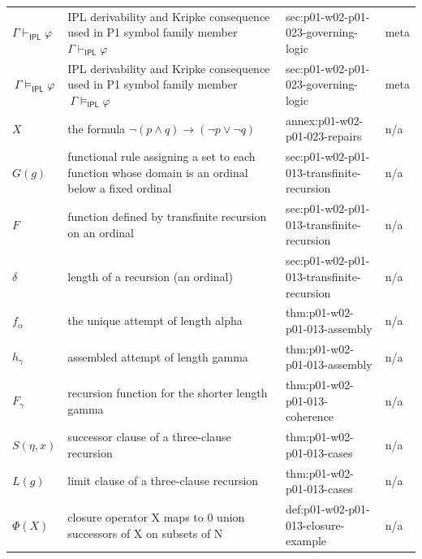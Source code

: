 \begin{longtable}{@{}p{}p{}p{}p{}@{}}
\(\Gamma\vdash_{\mathsf{IPL}}\varphi\) & IPL derivability and Kripke consequence used in P1 symbol family member \(\Gamma\vdash_{\mathsf{IPL}}\varphi\) & sec:\allowbreak{}p01-\allowbreak{}w02-\allowbreak{}p01-\allowbreak{}023-\allowbreak{}governing-\allowbreak{}logic & meta \\
\(\ \Gamma\models_{\mathsf{IPL}}\varphi\) & IPL derivability and Kripke consequence used in P1 symbol family member \(\ \Gamma\models_{\mathsf{IPL}}\varphi\) & sec:\allowbreak{}p01-\allowbreak{}w02-\allowbreak{}p01-\allowbreak{}023-\allowbreak{}governing-\allowbreak{}logic & meta \\
\(X\) & the formula \(\neg(p\land q)\to(\neg p\lor\neg q)\) & annex:\allowbreak{}p01-\allowbreak{}w02-\allowbreak{}p01-\allowbreak{}023-\allowbreak{}repairs & n/a \\
\(G(g)\) & functional rule assigning a set to each function whose domain is an ordinal below a fixed ordinal & sec:\allowbreak{}p01-\allowbreak{}w02-\allowbreak{}p01-\allowbreak{}013-\allowbreak{}transfinite-\allowbreak{}recursion & n/a \\
\(F\) & function defined by transfinite recursion on an ordinal & sec:\allowbreak{}p01-\allowbreak{}w02-\allowbreak{}p01-\allowbreak{}013-\allowbreak{}transfinite-\allowbreak{}recursion & n/a \\
\(\delta\) & length of a recursion (an ordinal) & sec:\allowbreak{}p01-\allowbreak{}w02-\allowbreak{}p01-\allowbreak{}013-\allowbreak{}transfinite-\allowbreak{}recursion & n/a \\
\(f_\alpha\) & the unique attempt of length alpha & thm:\allowbreak{}p01-\allowbreak{}w02-\allowbreak{}p01-\allowbreak{}013-\allowbreak{}assembly & n/a \\
\(h_\gamma\) & assembled attempt of length gamma & thm:\allowbreak{}p01-\allowbreak{}w02-\allowbreak{}p01-\allowbreak{}013-\allowbreak{}assembly & n/a \\
\(F_\gamma\) & recursion function for the shorter length gamma & thm:\allowbreak{}p01-\allowbreak{}w02-\allowbreak{}p01-\allowbreak{}013-\allowbreak{}coherence & n/a \\
\(S(\eta,\allowbreak x)\) & successor clause of a three-clause recursion & thm:\allowbreak{}p01-\allowbreak{}w02-\allowbreak{}p01-\allowbreak{}013-\allowbreak{}cases & n/a \\
\(L(g)\) & limit clause of a three-clause recursion & thm:\allowbreak{}p01-\allowbreak{}w02-\allowbreak{}p01-\allowbreak{}013-\allowbreak{}cases & n/a \\
\(\Phi(X)\) & closure operator X maps to {0} union successors of X on subsets of N & def:\allowbreak{}p01-\allowbreak{}w02-\allowbreak{}p01-\allowbreak{}013-\allowbreak{}closure-\allowbreak{}example & n/a \\

\end{longtable}
